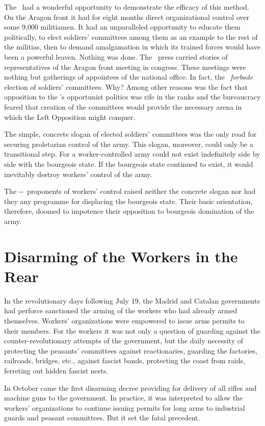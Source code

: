 The \POUM\ had a wonderful opportunity to demonstrate the efficacy of this method. On the Aragon front it had for eight months direct organizational control over some 9,000 militiamen. It had an unparalleled opportunity to educate them politically, to elect soldiers’ committees among them as an example to the rest of the militias, then to demand amalgamation in which its trained forces would have been a powerful leaven. Nothing was done. The \POUM\ press carried stories of representatives of the Aragon front meeting in congress. These meetings were nothing but gatherings of appointees of the national office. In fact, the \POUM\ \emph{forbade} election of soldiers’ committees. Why? Among other reasons was the fact that opposition to the \POUM’s opportunist politics was rife in the ranks and the bureaucracy feared that creation of the committees would provide the necessary arena in which the Left Opposition might conquer.

The simple, concrete slogan of elected soldiers’ committees was the only road for securing proletarian control of the army. This slogan, moreover, could only be a transitional step. For a worker-controlled army could not exist indefinitely side by side with the bourgeois state. If the bourgeois state continued to exist, it would inevitably destroy workers’ control of the army.

The \POUM-\CNT-\UGT\ proponents of workers’ control raised neither the concrete slogan nor had they any programme for displacing the bourgeois state. Their basic orientation, therefore, doomed to impotence their opposition to bourgeois domination of the army.

\section*{Disarming of the Workers in the Rear}

In the revolutionary days following July 19, the Madrid and Catalan governments had perforce sanctioned the arming of the workers who had already armed themselves. Workers’ organizations were empowered to issue arms permits to their members. For the workers it was not only a question of guarding against the counter-revolutionary attempts of the government, but the daily necessity of protecting the peasants’ committees against reactionaries, guarding the factories, railroads, bridges, etc., against fascist bands, protecting the coast from raids, ferreting out hidden fascist nests.

In October came the first disarming decree providing for delivery of all rifles and machine guns to the government. In practice, it was interpreted to allow the workers’ organizations to continue issuing permits for long arms to industrial guards and peasant committees. But it set the fatal precedent.

